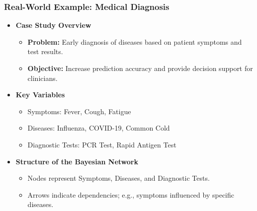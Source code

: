 \documentclass[aspectratio=169]{beamer}
\begin{document}
\begin{frame}[fragile]
    \frametitle{Real-World Example: Medical Diagnosis}
    \begin{itemize}
        \item \textbf{Case Study Overview}
        \begin{itemize}
            \item \textbf{Problem:} Early diagnosis of diseases based on patient symptoms and test results.
            \item \textbf{Objective:} Increase prediction accuracy and provide decision support for clinicians.
        \end{itemize}
        
        \item \textbf{Key Variables}
        \begin{itemize}
            \item Symptoms: Fever, Cough, Fatigue
            \item Diseases: Influenza, COVID-19, Common Cold
            \item Diagnostic Tests: PCR Test, Rapid Antigen Test
        \end{itemize}
        
        \item \textbf{Structure of the Bayesian Network}
        \begin{itemize}
            \item Nodes represent Symptoms, Diseases, and Diagnostic Tests.
            \item Arrows indicate dependencies; e.g., symptoms influenced by specific diseases.
        \end{itemize}
    \end{itemize}
\end{frame}
\end{document}
